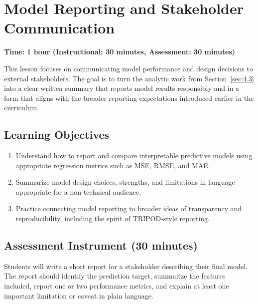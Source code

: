 \section{Model Reporting and Stakeholder Communication}
\label{sec:4.4}

\textbf{Time: 1 hour (Instructional: 30 minutes, Assessment: 30 minutes)}

\noindent This lesson focuses on communicating model performance and design decisions to external stakeholders. The goal is to turn the analytic work from Section~\ref{sec:4.3} into a clear written summary that reports model results responsibly and in a form that aligns with the broader reporting expectations introduced earlier in the curriculum.

\subsection{Learning Objectives}

\begin{enumerate}
    \item Understand how to report and compare interpretable predictive models using appropriate regression metrics such as MSE, RMSE, and MAE.
    \item Summarize model design choices, strengths, and limitations in language appropriate for a non-technical audience.
    \item Practice connecting model reporting to broader ideas of transparency and reproducibility, including the spirit of TRIPOD-style reporting.
\end{enumerate}

\subsection{Assessment Instrument (30 minutes)}

Students will write a short report for a stakeholder describing their final model. The report should identify the prediction target, summarize the features included, report one or two performance metrics, and explain at least one important limitation or caveat in plain language.


